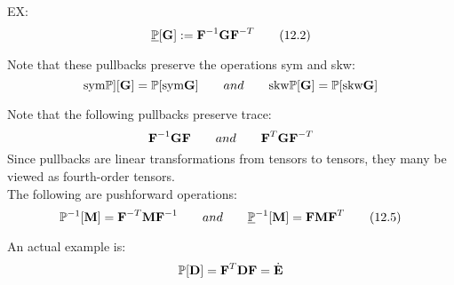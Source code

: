 \documentclass{article}
\begin{document}
EX:
\[
\underline{\mathbb{P}}[\textbf{G}]:=\textbf{F}^{-1}\textbf{G}\textbf{F}^{-T}\tag{12.2}
\]

Note that these pullbacks preserve the operations sym and skw:
\[
	\text{sym}\mathbb{P}][\textbf{G}] = \mathbb{P}[\text{sym}\textbf{G}] \qquad and \qquad \text{skw}\mathbb{P}[\textbf{G}]=\mathbb{P}[\text{skw}\textbf{G}]
\]

Note that the following pullbacks preserve trace:
\[
	\textbf{F}^{-1}\textbf{G}\textbf{F} \qquad and \qquad \textbf{F}^T\textbf{G}\textbf{F}^{-T}
\]
Since pullbacks are linear transformations from tensors to tensors, they many be viewed as fourth-order tensors.\\
The following are pushforward operations:
\[
	\mathbb{P}^{-1}[\textbf{M}] = \textbf{F}^{-T}\textbf{M}\textbf{F}^{-1} \qquad and \qquad \underline{\mathbb{P}}^{-1}[\textbf{M}] = \textbf{F}\textbf{M}\textbf{F}^T \tag{12.5}
\]

An actual example is:
\[
	\mathbb{P}[\textbf{D}] = \textbf{F}^T\textbf{D}\textbf{F} = \dot{\textbf{E}}
\]
\end{document}
